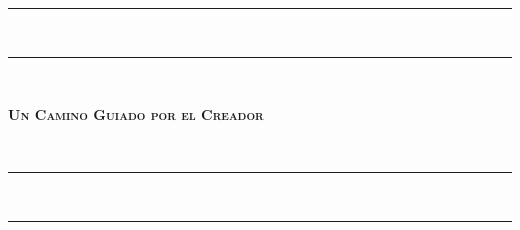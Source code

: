 {\begingroup
\iftablet
{}
\else
{}
\fi
\noindent
\hspace{-8mm}\parbox{6cm}{\rule{6cm}{1.6pt}\vspace*{-\baselineskip}\vspace*{2pt}\\ %
\rule{6cm}{0.4pt}\\[0.2\baselineskip] %
\parbox[c][2cm]{6cm}{\centering\textsc{\LARGE \textbf{Un Camino Guiado por el Creador}}\par}\\
\noindent\rule{6cm}{0.4pt}\vspace*{-\baselineskip}\vspace{3.2pt}\\ %
\rule{6cm}{1.6pt}}\\[\baselineskip]
\endgroup}
\cleardoublepage
